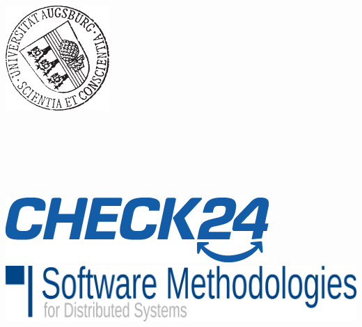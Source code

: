 \makeatletter
\begin{titlepage}
  \centering
  \huge
  \textsc{\@title}\par
  \LARGE\@subtitle
  \vspace*{10mm}

  \LARGE{\@author}

  \vspace*{10mm}

  \LARGE{\textsc{\art}}\\

  \large{%
    \degreetext\\
    \degree}

  \vspace*{10mm}

  \includegraphics[height=40mm]{figures/uni_siegel}

  \vspace*{5mm}

  \large
  \universitaet\\
  \vspace*{2mm}
  \institut\\
  \vspace*{2mm}
  \professur\\
  \vspace*{5mm}

  \monat~\jahr
  
  \vspace*{\fill}
  \includegraphics[width=.4\paperwidth]{figures/logo_CHECK24_transparent.png}
  \includegraphics[width=.4\paperwidth]{figures/logo_SMDS_transparent.png}
\end{titlepage}

